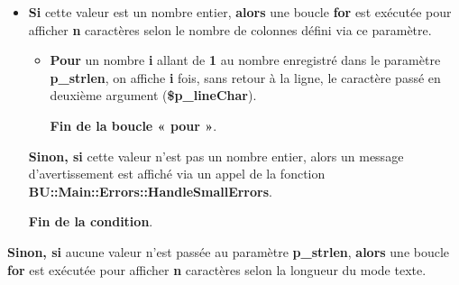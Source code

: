 \documentclass[a4paper,10pt]{article}
\begin{document}
\begin{itemize}
    \item
    {
        \begin{justify}
            \textbf{\color{brick}Si} cette valeur est un nombre entier, \textbf{\color{brick}alors} une boucle \textbf{\color{cyan}for} est exécutée pour afficher \textbf{n} caractères selon le nombre de colonnes défini via ce paramètre.\setlength{\parskip}{2em}
        \end{justify}\setlength{\parskip}{1em}

        \begin{itemize}
            \item
            {
                \begin{justify}
                    \textbf{\color{cyan}Pour} un nombre \textbf{\color{orange}i} allant de \textbf{\color{cyan}1} au nombre enregistré dans le paramètre \textbf{\color{orange}p\_strlen}, on affiche \textbf{\color{orange}i} fois, sans retour à la ligne, le caractère passé en deuxième argument (\textbf{\color{orange}\$p\_lineChar}).
                \end{justify}\setlength{\parskip}{1em}

                \begin{justify}
                    \textbf{\color{cyan}Fin de la boucle « pour »}.
                \end{justify}
            }
        \end{itemize}

        \begin{justify}
            \textbf{\color{brick}Sinon, si} cette valeur n'est pas un nombre entier, alors un message d'avertissement est affiché via un appel de la fonction \textbf{\color{mauve}BU::Main::Errors::HandleSmallErrors}.
        \end{justify}\setlength{\parskip}{1em}

        \begin{justify}
            \textbf{\color{brick}Fin de la condition}.
        \end{justify}\setlength{\parskip}{1em}
    }
\end{itemize}


\begin{justify}
    \textbf{\color{brick}Sinon, si} aucune valeur n'est passée au paramètre \textbf{\color{orange}p\_strlen}, \textbf{\color{brick}alors} une boucle \textbf{\color{cyan}for} est exécutée pour afficher \textbf{n} caractères selon la longueur du mode texte.
\end{justify}\setlength{\parskip}{1em}
\end{document}
